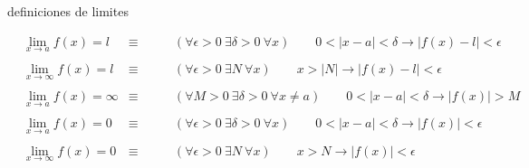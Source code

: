 \documentclass[12pt,a4paper]{extarticle}
\begin{document}
\begin{table}[!htbp]
\caption{definiciones de limites}
\begin{align*}
&\lim_{x \to a}f(x) = l  &  \equiv \qquad  &
( \forall \epsilon > 0 \ \exists \delta > 0 \ \forall x)  \qquad   0<|x-a|< \delta  \to  |f(x) - l| <
\epsilon  & \\
\\
&\lim_{x \to \infty}f(x) = l  &  \equiv  \qquad &
(\forall \epsilon > 0 \ \exists N \ \forall x) \qquad  x > |N|  \to
 |f(x) - l| < \epsilon & \\
\\
&\lim_{x \to a}f(x) = \infty  &  \equiv \qquad  &
(\forall M > 0 \ \exists \delta > 0 \ \forall x \neq a) \qquad   0<|x-a| < \delta  \to  |f(x)| >
M  & \\
\\
&\lim_{x \to a}f(x) = 0  &  \equiv   \qquad  &
(\forall \epsilon > 0 \ \exists \delta > 0 \ \forall x) \qquad   0<|x-a| < \delta  \to  |f(x)| <
\epsilon & \\
\\
&\lim_{x \to \infty}f(x) = 0  &  \equiv \qquad  &
(\forall \epsilon > 0 \ \exists N \ \forall x) \qquad   x > N  \to
 |f(x)| < \epsilon & \\
\end{align*}
\label{tab:limDef}
\end{table}
\end{document}
